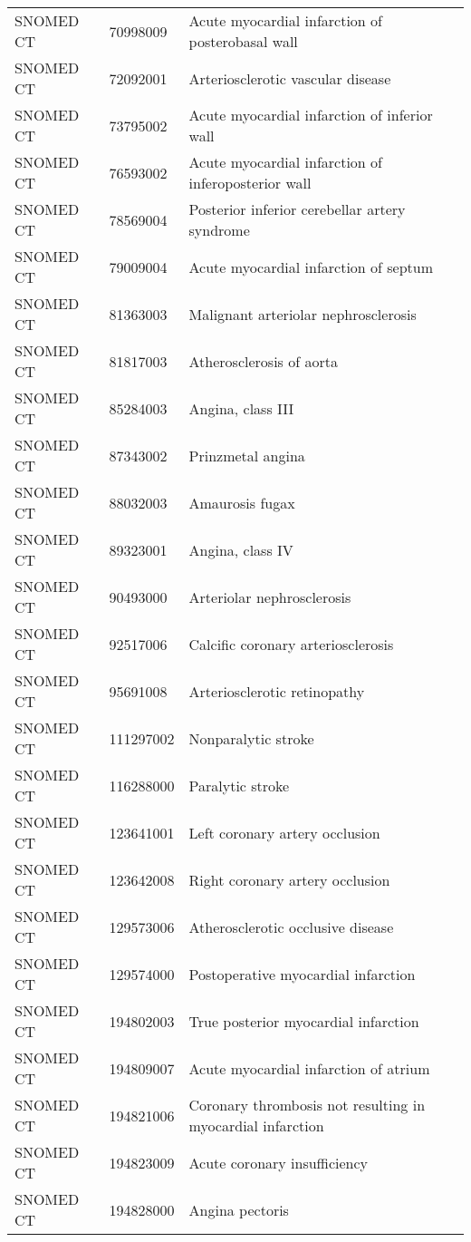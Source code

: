 \begin{longtable}{p{}p{}p{}}
  SNOMED CT & 70998009 & Acute myocardial infarction of posterobasal wall \\ 
  SNOMED CT & 72092001 & Arteriosclerotic vascular disease \\ 
  SNOMED CT & 73795002 & Acute myocardial infarction of inferior wall \\ 
  SNOMED CT & 76593002 & Acute myocardial infarction of inferoposterior wall \\ 
  SNOMED CT & 78569004 & Posterior inferior cerebellar artery syndrome \\ 
  SNOMED CT & 79009004 & Acute myocardial infarction of septum \\ 
  SNOMED CT & 81363003 & Malignant arteriolar nephrosclerosis \\ 
  SNOMED CT & 81817003 & Atherosclerosis of aorta \\ 
  SNOMED CT & 85284003 & Angina, class III \\ 
  SNOMED CT & 87343002 & Prinzmetal angina \\ 
  SNOMED CT & 88032003 & Amaurosis fugax \\ 
  SNOMED CT & 89323001 & Angina, class IV \\ 
  SNOMED CT & 90493000 & Arteriolar nephrosclerosis \\ 
  SNOMED CT & 92517006 & Calcific coronary arteriosclerosis \\ 
  SNOMED CT & 95691008 & Arteriosclerotic retinopathy \\ 
  SNOMED CT & 111297002 & Nonparalytic stroke \\ 
  SNOMED CT & 116288000 & Paralytic stroke \\ 
  SNOMED CT & 123641001 & Left coronary artery occlusion \\ 
  SNOMED CT & 123642008 & Right coronary artery occlusion \\ 
  SNOMED CT & 129573006 & Atherosclerotic occlusive disease \\ 
  SNOMED CT & 129574000 & Postoperative myocardial infarction \\ 
  SNOMED CT & 194802003 & True posterior myocardial infarction \\ 
  SNOMED CT & 194809007 & Acute myocardial infarction of atrium \\ 
  SNOMED CT & 194821006 & Coronary thrombosis not resulting in myocardial infarction \\ 
  SNOMED CT & 194823009 & Acute coronary insufficiency \\ 
  SNOMED CT & 194828000 & Angina pectoris \\ 

\end{longtable}
